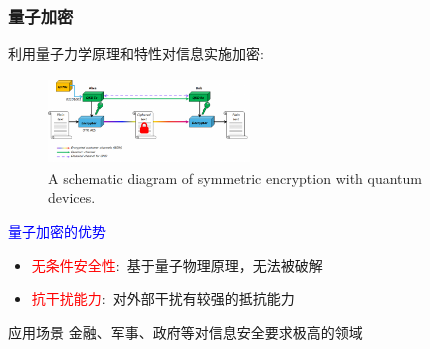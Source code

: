 \begin{frame}
    \frametitle{量子加密}
     利用量子力学原理和特性对信息实施加密:
    \begin{figure}
        \centering
                \includegraphics[height=0.9in, width=2.1in, viewport=0 0 568 235,clip]{Figures/Symmetric_encryption-with-quantum_devices.png}
		\caption{\tiny{\textrm{A schematic diagram of symmetric encryption with quantum devices.}}}
		\label{Fig:Symmetric_encryption-with-quantum_devices}
    \end{figure}
    \vskip -10pt

    \textcolor{blue}{量子加密的优势}
    \begin{itemize}
	    \item \textcolor{red}{无条件安全性}:~基于量子物理原理，无法被破解\\
		    {\fontsize{7.5pt}{5.2pt}\selectfont{\textcolor{blue}{量子相干态的稳定性保证了加密的安全性}}}
	    \item \textcolor{red}{抗干扰能力}:~对外部干扰有较强的抵抗能力
    \end{itemize}
    \begin{exampleblock}{应用场景}
        金融、军事、政府等对信息安全要求极高的领域
    \end{exampleblock}
\end{frame}

